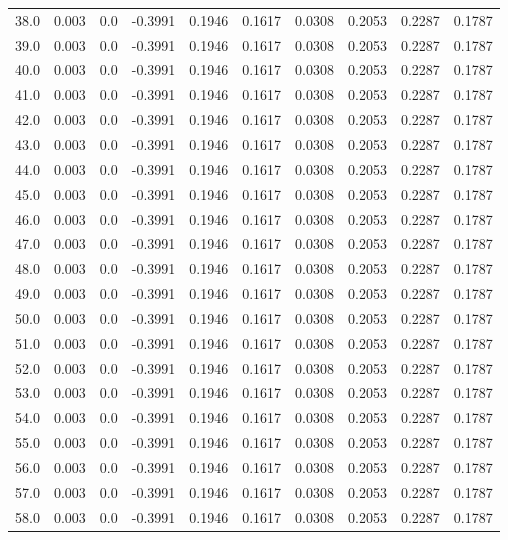 \begin{longtable}{lrrrrrrrrr}
38.0 & 0.003 & 0.0 & -0.3991 & 0.1946 & 0.1617 & 0.0308 & 0.2053 & 0.2287 & 0.1787 \\
39.0 & 0.003 & 0.0 & -0.3991 & 0.1946 & 0.1617 & 0.0308 & 0.2053 & 0.2287 & 0.1787 \\
40.0 & 0.003 & 0.0 & -0.3991 & 0.1946 & 0.1617 & 0.0308 & 0.2053 & 0.2287 & 0.1787 \\
41.0 & 0.003 & 0.0 & -0.3991 & 0.1946 & 0.1617 & 0.0308 & 0.2053 & 0.2287 & 0.1787 \\
42.0 & 0.003 & 0.0 & -0.3991 & 0.1946 & 0.1617 & 0.0308 & 0.2053 & 0.2287 & 0.1787 \\
43.0 & 0.003 & 0.0 & -0.3991 & 0.1946 & 0.1617 & 0.0308 & 0.2053 & 0.2287 & 0.1787 \\
44.0 & 0.003 & 0.0 & -0.3991 & 0.1946 & 0.1617 & 0.0308 & 0.2053 & 0.2287 & 0.1787 \\
45.0 & 0.003 & 0.0 & -0.3991 & 0.1946 & 0.1617 & 0.0308 & 0.2053 & 0.2287 & 0.1787 \\
46.0 & 0.003 & 0.0 & -0.3991 & 0.1946 & 0.1617 & 0.0308 & 0.2053 & 0.2287 & 0.1787 \\
47.0 & 0.003 & 0.0 & -0.3991 & 0.1946 & 0.1617 & 0.0308 & 0.2053 & 0.2287 & 0.1787 \\
48.0 & 0.003 & 0.0 & -0.3991 & 0.1946 & 0.1617 & 0.0308 & 0.2053 & 0.2287 & 0.1787 \\
49.0 & 0.003 & 0.0 & -0.3991 & 0.1946 & 0.1617 & 0.0308 & 0.2053 & 0.2287 & 0.1787 \\
50.0 & 0.003 & 0.0 & -0.3991 & 0.1946 & 0.1617 & 0.0308 & 0.2053 & 0.2287 & 0.1787 \\
51.0 & 0.003 & 0.0 & -0.3991 & 0.1946 & 0.1617 & 0.0308 & 0.2053 & 0.2287 & 0.1787 \\
52.0 & 0.003 & 0.0 & -0.3991 & 0.1946 & 0.1617 & 0.0308 & 0.2053 & 0.2287 & 0.1787 \\
53.0 & 0.003 & 0.0 & -0.3991 & 0.1946 & 0.1617 & 0.0308 & 0.2053 & 0.2287 & 0.1787 \\
54.0 & 0.003 & 0.0 & -0.3991 & 0.1946 & 0.1617 & 0.0308 & 0.2053 & 0.2287 & 0.1787 \\
55.0 & 0.003 & 0.0 & -0.3991 & 0.1946 & 0.1617 & 0.0308 & 0.2053 & 0.2287 & 0.1787 \\
56.0 & 0.003 & 0.0 & -0.3991 & 0.1946 & 0.1617 & 0.0308 & 0.2053 & 0.2287 & 0.1787 \\
57.0 & 0.003 & 0.0 & -0.3991 & 0.1946 & 0.1617 & 0.0308 & 0.2053 & 0.2287 & 0.1787 \\
58.0 & 0.003 & 0.0 & -0.3991 & 0.1946 & 0.1617 & 0.0308 & 0.2053 & 0.2287 & 0.1787 \\

\end{longtable}
